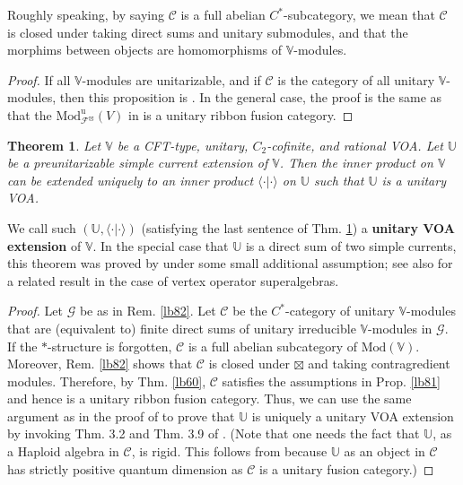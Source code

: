 \documentclass[11pt,b5paper,notitlepage]{article}
\theoremstyle{definition}
\theoremstyle{plain}
\newtheorem{thm}[df]{Theorem}
\newcommand{\mc}{\mathcal}
\newcommand{\bk}[1]{\langle {#1}\rangle}
\newcommand{\Vbb}{\mathbb V}
\newcommand{\Ubb}{\mathbb U}
\newcommand{\Mod}{\mathrm{Mod}}
\numberwithin{equation}{section}
\begin{document}
Roughly speaking, by saying $\mc C$ is a full abelian $C^*$-subcategory, we mean that $\mc C$ is closed under taking direct sums and unitary submodules, and that the morphims between objects are homomorphisms of $\Vbb$-modules.


\begin{proof}
If all $\Vbb$-modules are unitarizable, and if $\mc C$ is the category of all unitary $\Vbb$-modules, then this proposition is \cite[Thm. 7.9]{Gui19b}. In the general case, the proof is the same as that the $\Mod^{\mathrm u}_{\mc F^\boxtimes}(V)$ in \cite[Thm. 7.8]{Gui19b} is a unitary ribbon fusion category.
\end{proof}




\begin{thm}\label{lb80}
Let $\Vbb$ be a CFT-type, unitary, $C_2$-cofinite, and rational VOA. Let $\Ubb$ be a preunitarizable simple current extension of $\Vbb$. Then the inner product on $\Vbb$ can be extended uniquely to an inner product $\bk{\cdot|\cdot}$ on $\Ubb$ such that $\Ubb$ is a unitary VOA.
\end{thm}

We call such $(\Ubb,\bk{\cdot|\cdot})$ (satisfying the last sentence of Thm. \ref{lb80}) a \textbf{unitary VOA extension} of $\Vbb$. In the special case that $\Ubb$ is a direct sum of two simple currents, this theorem was proved by \cite[Thm. 3.3]{DL14} under some small additional assumption; see also \cite[Thm. 3.11]{CGH23} for a related result in the case of vertex operator superalgebras.





\begin{proof}
Let $\mc G$ be as in Rem. \ref{lb82}. Let $\mc C$ be the $C^*$-category of unitary $\Vbb$-modules that are (equivalent to) finite direct sums of unitary irreducible $\Vbb$-modules in $\mc G$. If the $*$-structure is forgotten, $\mc C$ is a full abelian subcategory of $\Mod(\Vbb)$. Moreover, Rem. \ref{lb82} shows that $\mc C$ is closed under $\boxtimes$ and taking contragredient modules. Therefore, by Thm. \ref{lb60}, $\mc C$ satisfies the assumptions in Prop. \ref{lb81} and hence is a unitary ribbon fusion category. Thus, we can use the same argument as in the proof of \cite[Thm. 4.7]{CGGH23} to prove that $\Ubb$ is uniquely a unitary VOA extension by invoking Thm. 3.2 and Thm. 3.9 of \cite{CGGH23}. (Note that one needs the fact that $\Ubb$, as a Haploid algebra in $\mc C$, is rigid. This follows from \cite[Lem. 1.20]{KO02} because $\Ubb$ as an object in $\mc C$ has strictly positive quantum dimension as $\mc C$ is a unitary fusion category.)
\end{proof}
\end{document}
